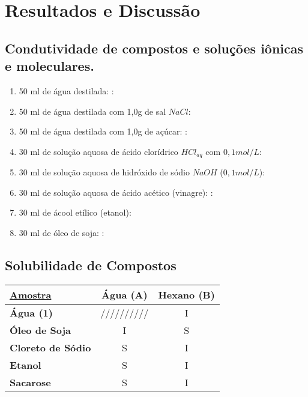 \chapter{Resultados e Discussão}

\section{Condutividade de compostos e soluções iônicas e moleculares.}

\begin{enumerate}
 \item 50 ml de água destilada:  : 
 \item 50 ml de água destilada com 1,0g de sal $NaCl$: 
 \item 50 ml de água destilada com 1,0g de açúcar: : 
 \item 30 ml de solução aquosa de ácido clorídrico $HCl_{aq}$ com $0,1 mol/L$: 
 \item 30 ml de solução aquosa de hidróxido de sódio $NaOH$ ($0,1 mol/L$): 
 \item 30 ml de solução aquosa de ácido acético (vinagre): : 
 \item 30 ml de ácool etílico (etanol): 
 \item 30 ml de óleo de soja: : 
\end{enumerate}


\section{Solubilidade de Compostos}
\begin{center}
 \begin{tabular}{|l|c|c|}
  \hline
  \underline{Amostra} & \textbf{Água (A)} & \textbf{Hexano (B)} \\
  \hline
  \textbf{Água (1)} & ////////// & I  \\
  \hline
  \textbf{Óleo de Soja} & I & S  \\
  \hline
  \textbf{Cloreto de Sódio} & S & I \\
  \hline
  \textbf{Etanol} & S & I \\
  \hline
  \textbf{Sacarose} & S & I \\
  \hline
 \end{tabular}
\end{center}
